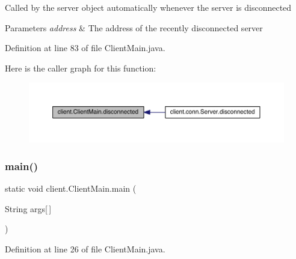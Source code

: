 Called by the {\ttfamily server} object automatically whenever the server is disconnected


\begin{DoxyParams}{Parameters}
{\em address} & The address of the recently disconnected server \\
\hline
\end{DoxyParams}


Definition at line 83 of file Client\+Main.\+java.

Here is the caller graph for this function\+:
\nopagebreak
\begin{figure}[H]
\begin{center}
\leavevmode
\includegraphics[width=350pt]{classclient_1_1_client_main_a824ffde5fd1b48d4a6ec25a9b00c3dc5_icgraph}
\end{center}
\end{figure}
\hypertarget{classclient_1_1_client_main_a1c318ff544d49e68acce0aeac5446336}{}\label{classclient_1_1_client_main_a1c318ff544d49e68acce0aeac5446336} 
\subsubsection{\texorpdfstring{main()}{main()}}
{\footnotesize\ttfamily static void client.\+Client\+Main.\+main (\begin{DoxyParamCaption}\item[{String}]{args\mbox{[}$\,$\mbox{]} }\end{DoxyParamCaption})\hspace{0.3cm}{\ttfamily [static]}}



Definition at line 26 of file Client\+Main.\+java.

